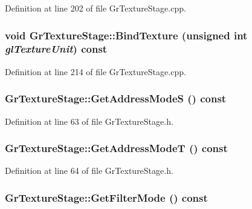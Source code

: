 \begin{CompactItemize}
Definition at line 202 of file GrTextureStage.cpp.\hypertarget{class_gr_texture_stage_485314fd955bae3e4b6c2c228381b8f6}{
\subsubsection[{BindTexture}]{\setlength{\rightskip}{0pt plus 5cm}void GrTextureStage::BindTexture (unsigned int {\em glTextureUnit}) const}}
\label{class_gr_texture_stage_485314fd955bae3e4b6c2c228381b8f6}




Definition at line 214 of file GrTextureStage.cpp.\hypertarget{class_gr_texture_stage_483ace52427b80106f568437c00c64ea}{
\subsubsection[{GetAddressModeS}]{ GrTextureStage::GetAddressModeS () const}}
\label{class_gr_texture_stage_483ace52427b80106f568437c00c64ea}




Definition at line 63 of file GrTextureStage.h.\hypertarget{class_gr_texture_stage_9abd7581b1a3526d6842ecf8b79baf58}{
\subsubsection[{GetAddressModeT}]{ GrTextureStage::GetAddressModeT () const}}
\label{class_gr_texture_stage_9abd7581b1a3526d6842ecf8b79baf58}




Definition at line 64 of file GrTextureStage.h.\hypertarget{class_gr_texture_stage_e2e876d39b788ceb501e17c0ea51eae0}{
\subsubsection[{GetFilterMode}]{ GrTextureStage::GetFilterMode () const}}
\label{class_gr_texture_stage_e2e876d39b788ceb501e17c0ea51eae0}





\end{CompactItemize}

